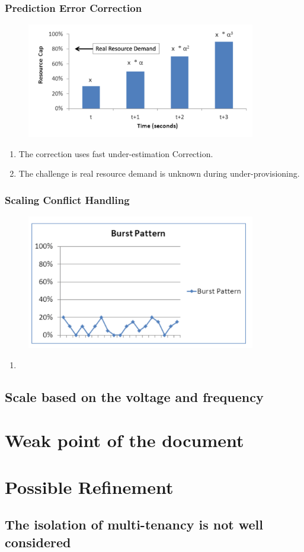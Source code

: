 \documentclass[acmlarge]{acmart}
\begin{document}
\subsubsection{Prediction Error Correction}
\begin{figure}[htbp]
  \centering
  \includegraphics[width=10cm]{./error_correction.png}
\end{figure}
\begin{enumerate}
  \item The correction uses fast under-estimation Correction.
  \item The challenge is real resource demand is unknown during under-provisioning.
\end{enumerate}

\subsubsection{Scaling Conflict Handling}
\begin{figure}[htbp]
  \centering
  \includegraphics[width=10cm]{./burst.png}
\end{figure}
\begin{enumerate}
  \item 
\end{enumerate}

\subsection{Scale based on the voltage and frequency}

\section{Weak point of the document}
\subsection{}
\section{Possible Refinement}
\subsection{The isolation of multi-tenancy is not well considered}



\end{document}
